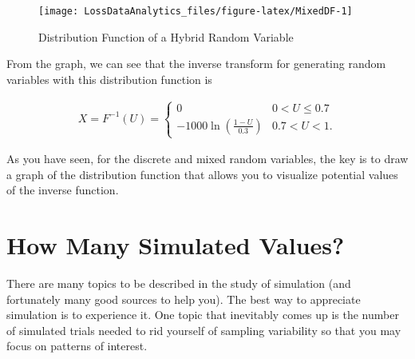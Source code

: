 \documentclass[]{book}
\theoremstyle{definition}
\theoremstyle{definition}
\theoremstyle{definition}
\theoremstyle{remark}
\begin{document}
\begin{figure}

{\centering \texttt{[image: LossDataAnalytics\_files/figure-latex/MixedDF-1]} 

}

\caption{Distribution Function of a Hybrid Random Variable}\label{fig:MixedDF}
\end{figure}

From the graph, we can see that the inverse transform for generating
random variables with this distribution function is

\[\begin{aligned}
X = F^{-1}(U) = \left\{ \begin{array}{cc}
              0 &  0< U  \leq  0.7  \\
              -1000 \ln (\frac{1-U}{0.3}) & 0.7 < U < 1 .
            \end{array} \right.\end{aligned}\]

As you have seen, for the discrete and mixed random variables, the key
is to draw a graph of the distribution function that allows you to
visualize potential values of the inverse function.

\section{How Many Simulated Values?}\label{how-many-simulated-values}

There are many topics to be described in the study of simulation (and
fortunately many good sources to help you). The best way to appreciate
simulation is to experience it. One topic that inevitably comes up is
the number of simulated trials needed to rid yourself of sampling
variability so that you may focus on patterns of interest.
\end{document}
